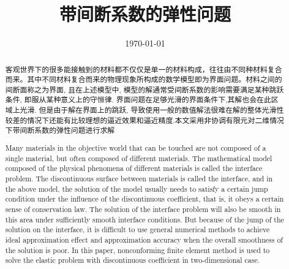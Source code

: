 \documentclass[a4paper,UTF8,titlepage]{ctexart}
\begin{document}
\title{带间断系数的弹性问题}
\date{\today}
\maketitle

\renewcommand{\abstractname}{\vspace{-2em}\large\bf 摘要}
\begin{abstract}
	
	客观世界下的很多能接触到的材料都不仅仅是单一的材料构成，往往由不同种材料复合而来。其中不同材料复合而来的物理现象所构成的数学模型即为界面问题。材料之间的间断面称之为界面, 且在上述模型中, 模型的解通常受间断系数的影响需要满足某种跳跃条件, 即服从某种意义上的守恒律. 界面问题在足够光滑的界面条件下,其解也会在此区域上光滑. 但是由于解在界面上的跳跃, 导致使用一般的数值解法很难在解的整体光滑性较差的情况下还能有比较理想的逼近效果和逼近精度.本文采用非协调有限元对二维情况下带间断系数的弹性问题进行求解  \\
	
\end{abstract}
\thispagestyle{empty}

\newpage

\renewcommand{\abstractname}{\vspace{-2em}\large\bf Abstract}
\begin{abstract}
	
	Many materials in the objective world that can be touched are not composed of a single material, but often composed of different materials. The mathematical model composed of the physical phenomena of different materials is called the interface problem. The discontinuous surface between materials is called the interface, and in the above model, the solution of the model usually needs to satisfy a certain jump condition under the influence of the discontinuous coefficient, that is, it obeys a certain sense of conservation law. The solution of the interface problem will also be smooth in this area under sufficiently smooth interface conditions. But because of the jump of the solution on the interface, it is difficult to use general numerical methods to achieve ideal approximation effect and approximation accuracy when the overall smoothness of the solution is poor. In this paper, nonconforming finite element method is used to solve the elastic problem with discontinuous coefficient in two-dimensional case.  \\
	
\end{abstract}
\thispagestyle{empty}
\end{document}
